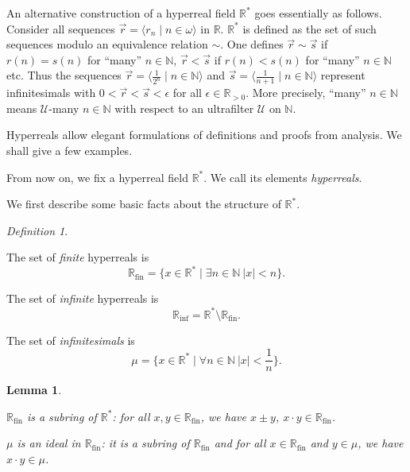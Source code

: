 \documentclass[a4paper, 11pt]{amsart}
\newtheorem{lemma}[lemma]{Lemma}
\theoremstyle{remark}
\newtheorem{definition}[definition]{Definition}
\newcommand{\NN}{\mathbb{N}}
\DeclareMathOperator{\fin}{fin}
\newcommand{\RR}{\mathbb{R}}
\newcommand{\cU}{\mathcal U}
\newenvironment{enumerate-(1)}{\begin{enumerate}[label={\upshape (\arabic*)}, leftmargin=2pc]}{\end{enumerate}}
\begin{document}
An alternative construction of a hyperreal field $\RR^*$ goes essentially as follows. 
Consider all sequences $\vec{r}=\langle r_n \mid n\in\omega\rangle$ in $\RR$. 
$\RR^*$ is defined as the set of such sequences modulo an equivalence relation $\sim$. 
One defines $\vec{r} \sim \vec{s}$ if $r(n)=s(n)$ for ``many'' $n\in\NN$, $\vec{r} < \vec{s}$ if $r(n)<s(n)$ for ``many'' $n\in\NN$ etc. 
Thus the sequences $\vec{r}=\langle \frac{1}{2^n} \mid n\in\NN\rangle$ and $\vec{s}=\langle \frac{1}{n+1} \mid n\in\NN\rangle$ represent infinitesimals with $0<\vec{r}<\vec{s}<\epsilon$ for all $\epsilon \in \RR_{>0}$. 
More precisely, ``many'' $n\in \NN$ means $\cU$-many $n\in\NN$ with respect to an ultrafilter $\cU$ on $\NN$. 

Hyperreals allow elegant formulations of definitions and proofs from analysis. 
We shall give a few examples. 


From now on, we fix a hyperreal field $\RR^*$. 
We call its elements \emph{hyperreals}. 

We first describe some basic facts about the structure of $\RR^*$. 

\begin{definition} \ 
\begin{enumerate-(1)} 
\item 
The set of \emph{finite} hyperreals is 
$$\RR_{\fin}=\{x\in \RR^*\mid \exists n\in \NN \ |x| <n\}.$$ 
\item 
The set of \emph{infinite} hyperreals is 
$$\RR_{\mathrm{inf}}=\RR^* \setminus \RR_{\fin}.$$ 
\item 
The set of \emph{infinitesimals} is 
$$\mu=\{ x\in \RR^* \mid \forall n\in\NN \ |x| <\frac{1}{n}\}.$$ 
\end{enumerate-(1)} 
\end{definition} 

\begin{lemma} \ 
\label{Rfin is a subring and mu is an ideal} 
\begin{enumerate-(1)} 
\item 
$\RR_{\fin}$ is a subring of $\RR^*$: for all $x,y\in \RR_{\fin}$, we have $x \pm y$, $x\cdot y\in \RR_{\fin}$.  
\item 
$\mu$ is an ideal in $\RR_{\fin}$: it is a subring of $\RR_{\fin}$ and for all $x\in \RR_{\fin}$ and $y\in \mu$, we have $x\cdot y\in \mu$. 
\end{enumerate-(1)} 
\end{lemma} 
\end{document}
